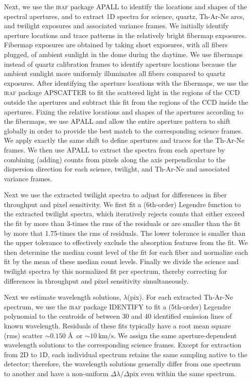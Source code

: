 \documentclass[twocolumn]{aastex6}
\begin{document}
Next, we use the \textsc{iraf} package APALL to identify the locations and shapes of the spectral apertures, and to extract 1D spectra for science, quartz, Th-Ar-Ne arcs, and twilight exposures and associated variance frames.
We initially identify aperture locations and trace patterns in the relatively bright fibermap exposures.
Fibermap exposures are obtained by taking short exposures, with all fibers plugged, of ambient sunlight in the dome during the daytime.
We use fibermaps instead of quartz calibration frames to identify aperture locations because the ambient sunlight more uniformly illuminates all fibers compared to quartz exposures.
After identifying the aperture locations with the fibermaps, we use the \textsc{iraf} package APSCATTER to fit the scattered light in the regions of the CCD outside the apertures and subtract this fit from the regions of the CCD inside the apertures.
Fixing the relative locations and shapes of the apertures according to the fibermaps, we use APALL and allow the entire aperture pattern to shift globally in order to provide the best match to the corresponding science frames.
We apply exactly the same shift to define apertures and traces for the Th-Ar-Ne frames.
We then use APALL to extract the spectra from each aperture by combining (adding) counts from pixels along the axis perpendicular to the dispersion direction for each science, twilight, and Th-Ar-Ne and associated variance frames.

Next we use the extracted twilight spectra to adjust for differences in fiber throughput and pixel sensitivity.
We first fit a (6th-order) Legendre function to the extracted twilight spectra, which iteratively rejects counts that either exceed the fit by more than 3-times the rms of the residuals or are smaller than the fit by more that 1.75-times the rms of residuals.
The lower tolerance is smaller than the upper tolerance to effectively exclude the absorption features from the fit.
We then determine the median count level of the fit for each fiber and normalize each fit by the mean of these median count levels.
Finally we divide the science and twilight spectra by this normalized fit per spectrum, thereby correcting for differences in throughput and pixel sensitivity simultaneously.

Next we estimate wavelength solutions, $\lambda$(pix).
For each extracted Th-Ar-Ne spectrum, we use the \textsc{iraf} package IDENTIFY to fit a (5th-order) Legendre polynomial to the centroids of between 30 and 40 identified emission lines of known wavelength.
Residuals of these fits typically have a root mean square (rms) scatter $\sim0.150$ \AA\ or $\sim10\ \mathrm{km/s}$.
We assign the same aperture-dependent wavelength solutions to the corresponding science frames.
Except for extraction from 2D to 1D, each individual spectrum retains the same sampling native to the detector; therefore, the wavelength solutions generally differ from one spectrum to another and have a non-uniform $\Delta\lambda/\Delta\mathrm{pix}$ even within the same spectrum.
\end{document}
